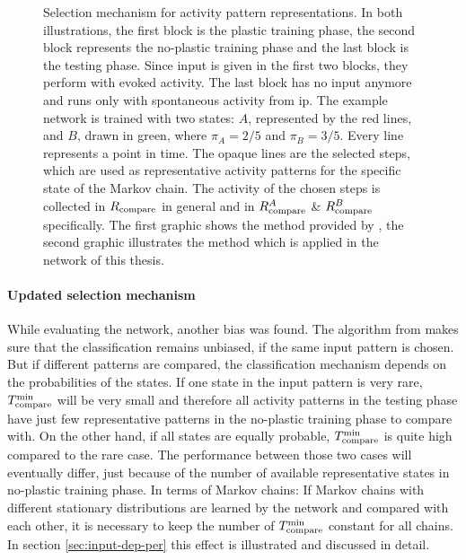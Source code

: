 \begin{figure}
    \caption[Selection mechanism for activity pattern representations]{Selection mechanism for activity pattern representations. In both illustrations, the first block is the plastic training phase, the second block represents the no-plastic training phase and the last block is the testing phase. Since input is given in the first two blocks, they perform with evoked activity. The last block has no input anymore and runs only with spontaneous activity from \acs{ip}. The example network is trained with two states: $A$, represented by the red lines, and $B$, drawn in green, where $\pi_A = 2/5$ and $\pi_B = 3/5$. Every line represents a point in time. The opaque lines are the selected steps, which are used as representative activity patterns for the specific state of the Markov chain. The activity of the chosen steps is collected in $R_{\text{compare}}$ in general and in $R_{\text{compare}}^A$ \& $R_{\text{compare}}^B$ specifically. The first graphic shows the method provided by \textcite{hartmann2015s}, the second graphic illustrates the method which is applied in the network of this thesis.}
    \label{fig:classification}
\end{figure}

\paragraph{Updated selection mechanism}

While evaluating the network, another bias was found. The algorithm from \textcite{hartmann2015s} makes sure that the classification remains unbiased, if the same input pattern is chosen. But if different patterns are compared, the classification mechanism depends on the probabilities of the states. If one state in the input pattern is very rare, $T_{\text{compare}}^{\text{min}}$ will be very small and therefore all activity patterns in the testing phase have just few representative patterns in the no-plastic training phase to compare with. On the other hand, if all states are equally probable, $T_{\text{compare}}^{\text{min}}$ is quite high compared to the rare case. The performance between those two cases will eventually differ, just because of the number of available representative states in no-plastic training phase. In terms of Markov chains: If Markov chains with different stationary distributions are learned by the network and compared with each other, it is necessary to keep the number of $T_{\text{compare}}^{\text{min}}$ constant for all chains. In section \ref{sec:input-dep-per} this effect is illustrated and discussed in detail.


